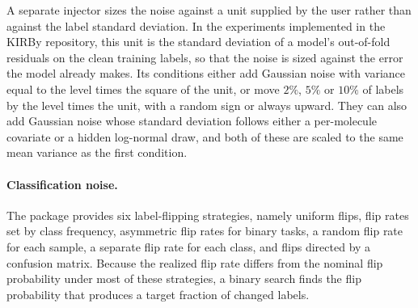 A separate injector sizes the noise against a unit supplied by the user rather than against the label standard
deviation. In the experiments implemented in the KIRBy repository, this unit is the standard deviation of a model's out-of-fold residuals on
the clean training labels, so that the noise is sized against the error the model already makes. Its
conditions either add Gaussian noise with variance equal to the level times the square of the unit, or move $2\%$,
$5\%$ or $10\%$ of labels by the level times the unit, with a random sign or always upward. They can also add
Gaussian noise whose standard deviation follows either a per-molecule covariate or a hidden
log-normal draw, and both of these are scaled to the same mean variance as the first condition.

\paragraph{Classification noise.} The package provides six label-flipping strategies, namely uniform flips,
flip rates set by class frequency, asymmetric flip rates for binary tasks, a random flip rate for each sample,
a separate flip rate for each class, and flips directed by a confusion matrix. Because the realized
flip rate differs from the nominal flip probability under most of these strategies, a binary search
finds the flip probability that produces a target fraction of changed labels.

